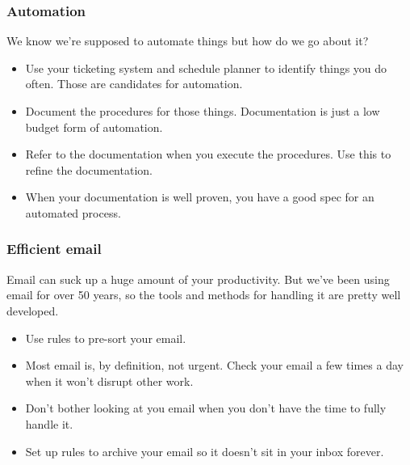 \documentclass[10pt]{beamer}
\begin{document}
\begin{frame}
  \frametitle{Automation}
  
    We know we're supposed to automate things but how do we go about it?
    
    \begin{itemize}
    \item Use your ticketing system and schedule planner to identify things
    you do often. Those are candidates for automation.
    \item Document the procedures for those things. Documentation is just a low
    budget form of automation.
    \item Refer to the documentation when you execute the procedures. Use
    this to refine the documentation.
    \item When your documentation is well proven, you have a good spec for 
    an automated process.
    \end{itemize}
     
\end{frame}

\begin{frame}
  \frametitle{Efficient email}
  
  Email can suck up a huge amount of your productivity. But we've been
  using email for over 50 years, so the tools and methods for handling it are 
  pretty well developed.
  
  \begin{itemize}
    \item Use rules to pre-sort your email.
    \item Most email is, by definition, not urgent. Check your email
    a few times a day when it won't disrupt other work.
    \item Don't bother looking at you email when you don't have the time 
    to fully handle it.
    \item Set up rules to archive your email so it doesn't sit in your inbox forever.
  \end{itemize}
  
         
\end{frame}
\end{document}

